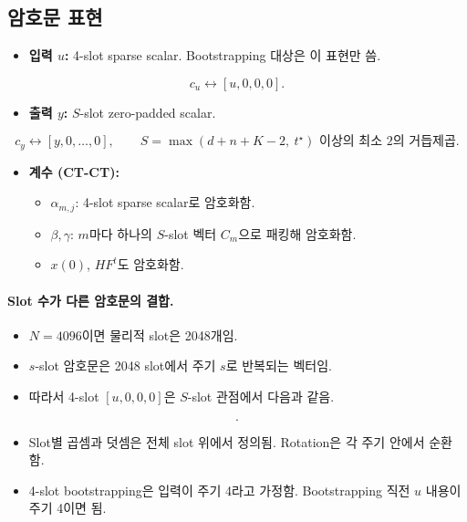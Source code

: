 \documentclass[11pt,a4paper]{article}
\begin{document}
\subsection{암호문 표현}
\begin{itemize}
\item \textbf{입력 $u$:} 4-slot sparse scalar. Bootstrapping 대상은 이 표현만 씀.
\end{itemize}
\begin{equation}
c_u\leftrightarrow[u,0,0,0].
\end{equation}
\begin{itemize}
\item \textbf{출력 $y$:} $S$-slot zero-padded scalar.
\end{itemize}
\begin{equation}
c_y\leftrightarrow[y,0,\dots,0],\qquad S=\text{$\max(d+n+K-2,\ t^\star)$ 이상의 최소 2의 거듭제곱}.
\end{equation}
\begin{itemize}
\item \textbf{계수 (CT-CT):}
  \begin{itemize}
  \item $\alpha_{m,j}$: 4-slot sparse scalar로 암호화함.
  \item $\beta,\gamma$: $m$마다 하나의 $S$-slot 벡터 $C_m$으로 패킹해 암호화함.
  \item $x(0)$, $HF^t$도 암호화함.
  \end{itemize}
\end{itemize}

\paragraph{Slot 수가 다른 암호문의 결합.}
\begin{itemize}
\item $N=4096$이면 물리적 slot은 2048개임.
\item $s$-slot 암호문은 2048 slot에서 주기 $s$로 반복되는 벡터임.
\item 따라서 4-slot $[u,0,0,0]$은 $S$-slot 관점에서 다음과 같음.
\end{itemize}
\begin{equation}
[u,0,0,0,\ u,0,0,0,\ \dots].
\end{equation}
\begin{itemize}
\item Slot별 곱셈과 덧셈은 전체 slot 위에서 정의됨. Rotation은 각 주기 안에서 순환함.
\item 4-slot bootstrapping은 입력이 주기 4라고 가정함. Bootstrapping 직전 $u$ 내용이 주기 4이면 됨.
\end{itemize}
\end{document}
